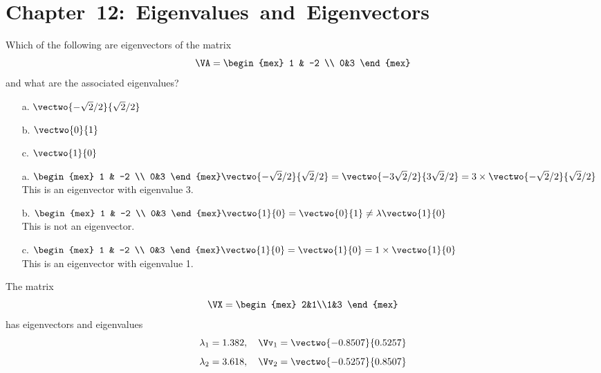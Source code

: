 \documentclass[12pt,ragged]{pajarticle}
\begin{document}


\section*{\hbox{Chapter 12: Eigenvalues and Eigenvectors}}

\begin{question}{1}{%
Which of the following are eigenvectors of the matrix
\[ \VA = \begin{mex} 1 & -2 \\ 0&3 \end{mex} \] and what are the associated eigenvalues?
\begin{itemize}
	\item[a.] $\vectwo{-\sqrt{2}/2}{\sqrt{2}/{2}}$
	\item[b.] $\vectwo{0}{1}$
	\item[c.] $\vectwo{1}{0}$
\end{itemize}
}{
\begin{itemize}
	\item[a.] $ \begin{mex} 1 & -2 \\ 0&3 \end{mex}\vectwo{-\sqrt{2}/2}{\sqrt{2}/{2}} = \vectwo{-3\sqrt{2}/2}{3\sqrt{2}/2} = 3\times\vectwo{-\sqrt{2}/2}{\sqrt{2}/2} $ \\
	\smallskip
	This is an eigenvector with eigenvalue 3.
	\item[b.] $ \begin{mex} 1 & -2 \\ 0&3 \end{mex}\vectwo{1}{0} = \vectwo{0}{1} \ne \lambda\vectwo{1}{0} $ \\
	\smallskip
	This is not an eigenvector.
	\item[c.] $ \begin{mex} 1 & -2 \\ 0&3 \end{mex}\vectwo{1}{0} = \vectwo{1}{0} = 1\times\vectwo{1}{0} $ \\
	\smallskip
	This is an eigenvector with eigenvalue 1.
\end{itemize}
}
\end{question}

The matrix 
\[ \VX = \begin{mex} 2&1\\1&3 \end{mex} \]
has eigenvectors and eigenvalues
\[ \lambda_1 = 1.382,\quad \Vv_1 = \vectwo{-0.8507}{0.5257} \]
\[ \lambda_2 = 3.618,\quad \Vv_2 = \vectwo{-0.5257}{0.8507} \]
\end{document}
